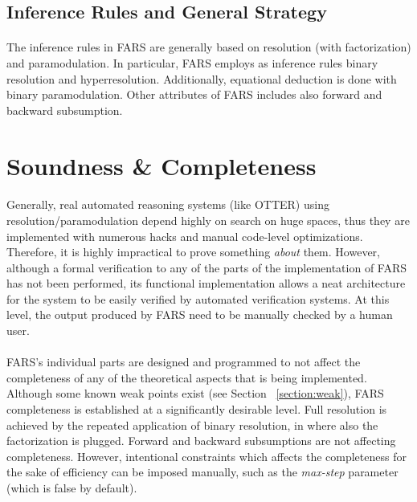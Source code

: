 \documentclass[11pt]{report}
\begin{document}
\subsection{Inference Rules and General Strategy}

\paragraph{} The inference rules in FARS are generally based on resolution (with factorization) and paramodulation. In particular, FARS employs as inference rules binary resolution and hyperresolution. Additionally, equational deduction is done with binary paramodulation. Other attributes of FARS includes also forward and backward subsumption.

\section{Soundness \& Completeness}

\paragraph{} Generally, real automated reasoning systems (like OTTER) using resolution/paramodulation depend highly on search on huge spaces, thus they are implemented with numerous hacks and manual code-level optimizations. Therefore, it is highly impractical to prove something \emph{about} them. However, although a formal verification to any of the parts of the implementation of FARS has not been performed, its functional implementation allows a neat architecture for the system to be easily verified by automated verification systems. At this level, the output produced by FARS need to be manually checked by a human user.

\paragraph{} FARS's individual parts are designed and programmed to not affect the completeness of any of the theoretical aspects that is being implemented. Although some known weak points exist (see Section ~\ref{section:weak}), FARS completeness is established at a significantly desirable level. Full resolution is achieved by the repeated application of binary resolution, in where also the factorization is plugged. Forward and backward subsumptions are not affecting completeness. However, intentional constraints which affects the completeness for the sake of efficiency can be imposed manually, such as the \emph{max-step} parameter (which is false by default).
\end{document}
